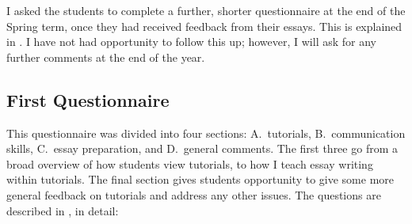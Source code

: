 I asked the students to complete a further, shorter questionnaire at the end of the Spring term, once they had received feedback from their essays. This is explained in . I have not had opportunity to follow this up; however, I will ask for any further comments at the end of the year.

\subsection{First Questionnaire}\label{sec:form1}

This questionnaire was divided into four sections: A.\ tutorials, B.\ communication skills, C.\ essay preparation, and D.\ general comments. The first three go from a broad overview of how students view tutorials, to how I teach essay writing within tutorials. The final section gives students opportunity to give some more general feedback on tutorials and address any other issues. The questions are described in , in detail:
